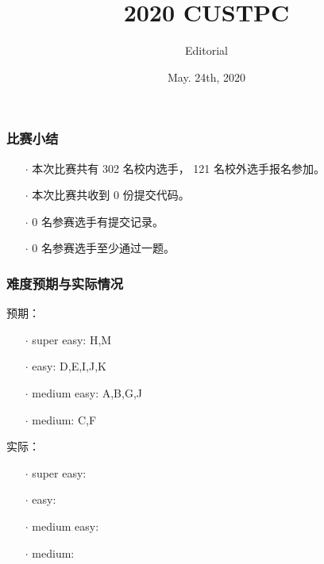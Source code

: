 \setlength{\parskip}{0.5\baselineskip}


\title{2020 CUSTPC}
\author{Editorial}
\date{May. 24th, 2020} 

\newcommand{\problemname}{A}

\begin{frame}
\titlepage

\end{frame}

\makeatletter
\newcommand\resetstackedplots{
\makeatletter
\pgfplots@stacked@isfirstplottrue
\makeatother
\addplot [forget plot,draw=none,x=P,y=z] coordinates{\problemdata};
}
\makeatother

\begin{frame}\frametitle{比赛小结}

\begin{itemize}
\item[$\cdot$] 本次比赛共有 302 名校内选手， 121 名校外选手报名参加。
\item[$\cdot$] 本次比赛共收到 0 份提交代码。
\item[$\cdot$] 0 名参赛选手有提交记录。
\item[$\cdot$] 0 名参赛选手至少通过一题。
\end{itemize}

\end{frame}

\begin{frame}\frametitle{难度预期与实际情况}

预期：
\begin{itemize}
\item[$\cdot$] super easy: H,M
\item[$\cdot$] easy: D,E,I,J,K
\item[$\cdot$] medium easy: A,B,G,J
\item[$\cdot$] medium: C,F
\end{itemize}
实际：
\begin{itemize}
\item[$\cdot$] super easy:  
\item[$\cdot$] easy:
\item[$\cdot$] medium easy:
\item[$\cdot$] medium:
\end{itemize}

\end{frame}

